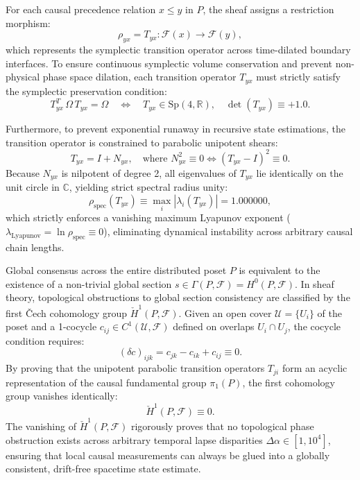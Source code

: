 \documentclass[11pt,onecolumn]{article}
\begin{document}
For each causal precedence relation $x \le y$ in $P$, the sheaf assigns a restriction morphism:
\begin{equation}
\rho_{yx} = T_{yx}: \mathcal{F}(x) \longrightarrow \mathcal{F}(y),
\label{eq:poset_restriction_morphism}
\end{equation}
which represents the symplectic transition operator across time-dilated boundary interfaces. To ensure continuous symplectic volume conservation and prevent non-physical phase space dilation, each transition operator $T_{yx}$ must strictly satisfy the symplectic preservation condition:
\begin{equation}
T_{yx}^T \, \Omega \, T_{yx} = \Omega \quad \iff \quad T_{yx} \in \text{Sp}(4, \mathbb{R}), \quad \det(T_{yx}) \equiv +1.0.
\label{eq:symplectic_group_sp4}
\end{equation}

Furthermore, to prevent exponential runaway in recursive state estimations, the transition operator is constrained to parabolic unipotent shears:
\begin{equation}
T_{yx} = I + N_{yx}, \quad \text{where } N_{yx}^2 \equiv 0 \iff (T_{yx} - I)^2 \equiv 0.
\label{eq:unipotent_parabolic_shear}
\end{equation}
Because $N_{yx}$ is nilpotent of degree 2, all eigenvalues of $T_{yx}$ lie identically on the unit circle in $\mathbb{C}$, yielding strict spectral radius unity:
\begin{equation}
\rho_{\text{spec}}(T_{yx}) \equiv \max_i |\lambda_i(T_{yx})| = 1.000000,
\label{eq:poset_spectral_radius_unity}
\end{equation}
which strictly enforces a vanishing maximum Lyapunov exponent ($\lambda_{\text{Lyapunov}} = \ln \rho_{\text{spec}} \equiv 0$), eliminating dynamical instability across arbitrary causal chain lengths.

Global consensus across the entire distributed poset $P$ is equivalent to the existence of a non-trivial global section $s \in \Gamma(P, \mathcal{F}) = H^0(P, \mathcal{F})$. In sheaf theory, topological obstructions to global section consistency are classified by the first \v{C}ech cohomology group $\check{H}^1(P, \mathcal{F})$. Given an open cover $\mathcal{U} = \{U_i\}$ of the poset and a 1-cocycle $c_{ij} \in C^1(\mathcal{U}, \mathcal{F})$ defined on overlaps $U_i \cap U_j$, the cocycle condition requires:
\begin{equation}
(\delta c)_{ijk} = c_{jk} - c_{ik} + c_{ij} \equiv 0.
\label{eq:cech_cocycle_differential}
\end{equation}
By proving that the unipotent parabolic transition operators $T_{ji}$ form an acyclic representation of the causal fundamental group $\pi_1(P)$, the first cohomology group vanishes identically:
\begin{equation}
\check{H}^1(P, \mathcal{F}) \equiv 0.
\label{eq:cech_h1_vanishing}
\end{equation}
The vanishing of $\check{H}^1(P, \mathcal{F})$ rigorously proves that no topological phase obstruction exists across arbitrary temporal lapse disparities $\Delta\alpha \in [1, 10^4]$, ensuring that local causal measurements can always be glued into a globally consistent, drift-free spacetime state estimate.
\end{document}
